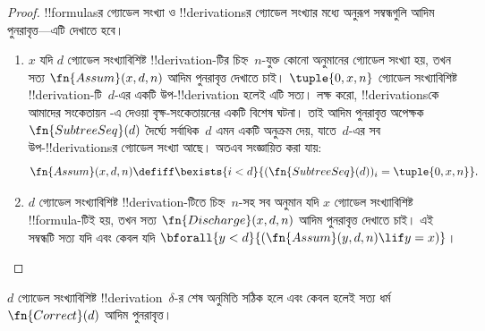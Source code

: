 \documentclass[../../../include/open-logic-section]{subfiles}
\begin{document}
\begin{proof}
  !!{formula}sর গ্যোডেল সংখ্যা ও !!{derivation}sর গ্যোডেল সংখ্যার মধ্যে
  অনুরূপ সম্বন্ধগুলি আদিম পুনরাবৃত্ত—এটি দেখাতে হবে।
  \begin{enumerate}
  \item $x$ যদি $d$ গ্যোডেল সংখ্যাবিশিষ্ট !!{derivation}-টির চিহ্ন~$n$-যুক্ত
    কোনো অনুমানের গ্যোডেল সংখ্যা হয়, তখন সত্য $\fn{Assum}(x, d, n)$ আদিম
    পুনরাবৃত্ত দেখাতে চাই। $\tuple{0, x, n}$ গ্যোডেল সংখ্যাবিশিষ্ট
    !!{derivation}-টি~$d$-এর একটি উপ-!!{derivation} হলেই এটি সত্য। লক্ষ করো,
    !!{derivation}sকে আমাদের সংকেতায়ন
    -এ দেওয়া বৃক্ষ-সংকেতায়নের একটি বিশেষ ঘটনা।
    তাই আদিম পুনরাবৃত্ত অপেক্ষক $\fn{SubtreeSeq}(d)$ দৈর্ঘ্যে সর্বাধিক~$d$
    এমন একটি অনুক্রম দেয়, যাতে~$d$-এর সব উপ-!!{derivation}sর গ্যোডেল সংখ্যা
    আছে। অতএব সংজ্ঞায়িত করা যায়:
    \[
    \fn{Assum}(x, d, n) \defiff \bexists{i<d}{(\fn{SubtreeSeq}(d))_i =
      \tuple{0, x, n}}.
    \]
  \item $d$ গ্যোডেল সংখ্যাবিশিষ্ট !!{derivation}-টিতে চিহ্ন~$n$-সহ সব অনুমান
    যদি $x$ গ্যোডেল সংখ্যাবিশিষ্ট !!{formula}-টিই হয়, তখন সত্য
    $\fn{Discharge}(x, d, n)$ আদিম পুনরাবৃত্ত দেখাতে চাই। এই সম্বন্ধটি সত্য
    যদি এবং কেবল যদি $\bforall{y<d}{(\fn{Assum}(y, d, n) \lif y = x)}$।
  \end{enumerate}
\end{proof}

\begin{prop}
  $d$ গ্যোডেল সংখ্যাবিশিষ্ট !!{derivation}~$\delta$-র শেষ অনুমিতি সঠিক হলে
  এবং কেবল হলেই সত্য ধর্ম $\fn{Correct}(d)$ আদিম পুনরাবৃত্ত।
\end{prop}
\end{document}
